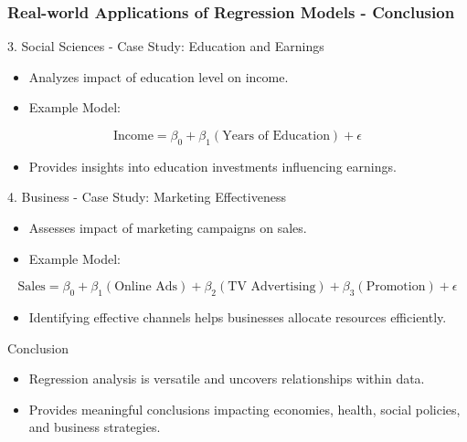 \documentclass[aspectratio=169]{beamer}
\begin{document}
\begin{frame}[fragile]
    \frametitle{Real-world Applications of Regression Models - Conclusion}
    \begin{block}{3. Social Sciences - Case Study: Education and Earnings}
        \begin{itemize}
            \item Analyzes impact of education level on income.
            \item Example Model:
            \end{itemize}
            \begin{equation}
            \text{Income} = \beta_0 + \beta_1(\text{Years of Education}) + \epsilon
            \end{equation}
            \begin{itemize}
                \item Provides insights into education investments influencing earnings.
            \end{itemize}
    \end{block}

    \begin{block}{4. Business - Case Study: Marketing Effectiveness}
        \begin{itemize}
            \item Assesses impact of marketing campaigns on sales.
            \item Example Model:
            \end{itemize}
            \begin{equation}
            \text{Sales} = \beta_0 + \beta_1(\text{Online Ads}) + \beta_2(\text{TV Advertising}) + \beta_3(\text{Promotion}) + \epsilon
            \end{equation}
            \begin{itemize}
                \item Identifying effective channels helps businesses allocate resources efficiently.
            \end{itemize}
    \end{block}

    \begin{block}{Conclusion}
        \begin{itemize}
            \item Regression analysis is versatile and uncovers relationships within data.
            \item Provides meaningful conclusions impacting economies, health, social policies, and business strategies.
        \end{itemize}
    \end{block}
\end{frame}
\end{document}
